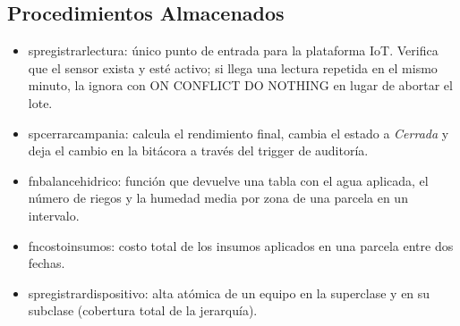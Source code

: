 \documentclass[11pt,letterpaper]{article}
\newcommand{\tbus}{\textunderscore\allowbreak}
\newcommand{\tb}[1]{{\ttfamily\let\_\tbus #1}}
\begin{document}
\begin{table}[H]
\centering\small
{}
\caption{Primeras filas de \tb{vw\_alertas\_pendientes}.}
\end{table}


\subsection{Procedimientos Almacenados}

\begin{itemize}[leftmargin=1.4em,itemsep=0.1em]
\item \tb{sp\_registrar\_lectura}: único punto de entrada para la plataforma IoT. Verifica que el sensor exista y esté activo; si llega una lectura repetida en el mismo minuto, la ignora con \tb{ON CONFLICT DO NOTHING} en lugar de abortar el lote.
\item \tb{sp\_cerrar\_campania}: calcula el rendimiento final, cambia el estado a \emph{Cerrada} y deja el cambio en la bitácora a través del trigger de auditoría.
\item \tb{fn\_balance\_hidrico}: función que devuelve una tabla con el agua aplicada, el número de riegos y la humedad media por zona de una parcela en un intervalo.
\item \tb{fn\_costo\_insumos}: costo total de los insumos aplicados en una parcela entre dos fechas.
\item \tb{sp\_registrar\_dispositivo}: alta atómica de un equipo en la superclase y en su subclase (cobertura total de la jerarquía).
\end{itemize}
\end{document}
